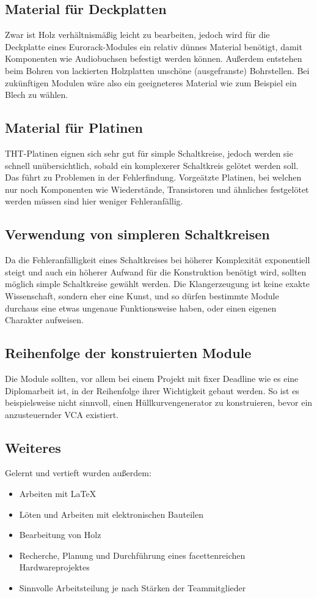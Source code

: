 \subsection*{Material für Deckplatten}
\label{sec:orge43bfc6}
Zwar ist Holz verhältnismäßig leicht zu bearbeiten, jedoch wird für die Deckplatte eines Eurorack-Modules ein relativ dünnes Material benötigt, damit Komponenten wie Audiobuchsen befestigt werden können. Außerdem entstehen beim Bohren von lackierten Holzplatten unschöne (ausgefranste) Bohrstellen. Bei zukünftigen Modulen wäre also ein geeigneteres Material wie zum Beispiel ein Blech zu wählen.

\subsection*{Material für Platinen}
\label{sec:org5c31c70}
THT-Platinen eignen sich sehr gut für simple Schaltkreise, jedoch werden sie schnell unübersichtlich, sobald ein komplexerer Schaltkreis gelötet werden soll. Das führt zu Problemen in der Fehlerfindung. Vorgeätzte Platinen, bei welchen nur noch Komponenten wie Wiederstände, Transistoren und ähnliches festgelötet werden müssen sind hier weniger Fehleranfällig.

\subsection*{Verwendung von simpleren Schaltkreisen}
\label{sec:org41f9e0e}
Da die Fehleranfälligkeit eines Schaltkreises bei höherer Komplexität exponentiell steigt und auch ein höherer Aufwand für die Konstruktion benötigt wird, sollten möglich simple Schaltkreise gewählt werden. Die Klangerzeugung ist keine exakte Wissenschaft, sondern eher eine Kunst, und so dürfen bestimmte Module durchaus eine etwas ungenaue Funktionsweise haben, oder einen eigenen Charakter aufweisen.

\subsection*{Reihenfolge der konstruierten Module}
\label{sec:orgeab8c6e}
Die Module sollten, vor allem bei einem Projekt mit fixer Deadline wie es eine Diplomarbeit ist, in der Reihenfolge ihrer Wichtigkeit gebaut werden. So ist es beispielsweise nicht sinnvoll, einen Hüllkurvengenerator zu konstruieren, bevor ein anzusteuernder \ac{VCA} existiert.

\subsection*{Weiteres}
\label{sec:org3ac2be2}
Gelernt und vertieft wurden außerdem:
\begin{itemize}
\item Arbeiten mit \LaTeX
\item Löten und Arbeiten mit elektronischen Bauteilen
\item Bearbeitung von Holz
\item Recherche, Planung und Durchführung eines facettenreichen Hardwareprojektes
\item Sinnvolle Arbeitsteilung je nach Stärken der Teammitglieder
\end{itemize}
